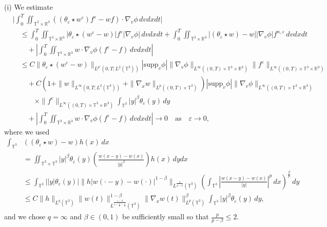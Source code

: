 \documentclass[10pt,reqno]{amsart}
\numberwithin{equation}{section}
\newcommand{\R}{\mathbb R}
\newcommand{\T}{\mathbb T}
\newcommand{\bq}{\begin{equation}}
\newcommand{\eq}{\end{equation}}
\newcommand{\e}{\varepsilon}
\newcommand{\lt}{\left}
\newcommand{\rt}{\right}
\newcommand{\intt}{\int_{\T^3}}
\newcommand{\inttr}{\iint_{\T^3 \times \R^3}}
\begin{document}
\medskip

\noindent (i) We estimate
\begin{align*}
&\bigg|\int_0^T \inttr ((\theta_\e \star w^\e)  f^\e - w f)\cdot \nabla_v \phi \,dvdxdt \bigg|\\
&\quad \le\int_0^T \inttr  |\theta_\e \star (w^\e - w)| f^\e |\nabla_v \phi|\,dvdxdt + \int_0^T \inttr |(\theta_\e \star w) - w| |\nabla_v \phi| f^{n,\e}\,dvdxdt\\
&\qquad + \lt|\int_0^T \inttr w\cdot \nabla_v \phi (f^\e -f)\,dvdxdt \rt|\\
&\quad \le C\|\theta_\e \star(w^\e -w)\|_{L^{p'}(0,T;L^2(\T^3))}|\mbox{supp}_v \phi| \|\nabla_v \phi\|_{L^\infty((0,T)\times\T^3\times\R^3)}\|f^\e\|_{L^\infty((0,T)\times\T^3\times\R^3)}\\
&\qquad + C(1+\|w\|_{L^\infty(0,T;L^2(\T^3))}+\|\nabla_x w\|_{L^p((0,T)\times\T^3)})|\mbox{supp}_v \phi| \|\nabla_v \phi\|_{L^\infty((0,T)\times\T^3\times\R^3)}\\
&\qquad \quad \times\|f^\e\|_{L^\infty((0,T)\times\T^3\times\R^3)} \intt |y|^\beta \theta_\e (y)\,dy\\
&\qquad + \lt|\int_0^T \inttr w\cdot \nabla_v \phi (f^\e -f)\,dvdxdt \rt| \to 0 \quad \mbox{as} \quad \e \to 0,
\end{align*}
where we used
\bq\label{quo_est}
\begin{aligned}
\intt& ((\theta_\e \star w) - w) h(x)\,dx \\
&= \iint_{\T^3\times\T^3} |y|^\beta\theta_\e(y) \lt(\frac{w(x-y)-w(x)}{|y|^\beta} \rt) h(x)\,dydx \\
&\le \intt ||y|\theta_\e(y)| \|h|w(\cdot-y)-w(\cdot)|^{1-\beta}\|_{L^{\frac{p}{p-\beta}}(\T^3)}\lt(\intt  \lt|\frac{w(x-y)-w(x)}{|y|} \rt|^p\,dx\rt)^{\frac\beta p}\,dy\\
&\le C\|h\|_{L^q(\T^3)}\|w(t)\|_{L^{\frac{1-\beta}{1-\frac \beta p - \frac 1q}}(\T^3)}^{1-\beta}\|\nabla_x w(t)\|_{L^p(\T^3)}^\beta \intt |y|^\beta\theta_\e(y)\,dy,
\end{aligned}
\eq
and we chose $q=\infty$ and $\beta \in (0,1)$ be sufficiently small so that $\frac{p}{p-\beta} \le 2$.

\medskip
\end{document}
